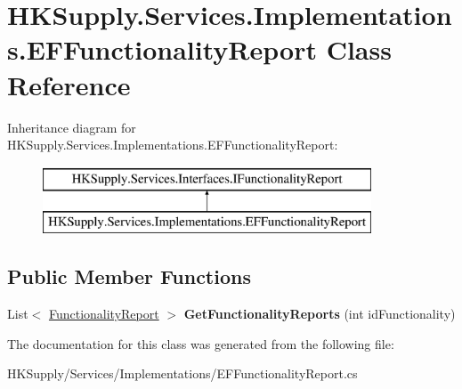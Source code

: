 \hypertarget{class_h_k_supply_1_1_services_1_1_implementations_1_1_e_f_functionality_report}{}\section{H\+K\+Supply.\+Services.\+Implementations.\+E\+F\+Functionality\+Report Class Reference}
\label{class_h_k_supply_1_1_services_1_1_implementations_1_1_e_f_functionality_report}
Inheritance diagram for H\+K\+Supply.\+Services.\+Implementations.\+E\+F\+Functionality\+Report\+:\begin{figure}[H]
\begin{center}
\leavevmode
\includegraphics[height=2.000000cm]{class_h_k_supply_1_1_services_1_1_implementations_1_1_e_f_functionality_report}
\end{center}
\end{figure}
\subsection*{Public Member Functions}
\begin{DoxyCompactItemize}
\item 
\mbox{\label{class_h_k_supply_1_1_services_1_1_implementations_1_1_e_f_functionality_report_a3fd0213e6dd29f7af0d096c7ffb9bea5}} 
List$<$ \mbox{\hyperlink{class_h_k_supply_1_1_models_1_1_functionality_report}{Functionality\+Report}} $>$ {\bfseries Get\+Functionality\+Reports} (int id\+Functionality)
\end{DoxyCompactItemize}


The documentation for this class was generated from the following file\+:\begin{DoxyCompactItemize}
\item 
H\+K\+Supply/\+Services/\+Implementations/E\+F\+Functionality\+Report.\+cs\end{DoxyCompactItemize}
